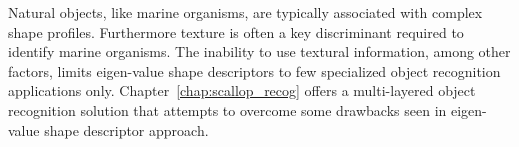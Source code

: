 \documentclass {udthesis}
\begin{document}
Natural objects, like marine organisms, are typically associated with complex shape profiles. Furthermore texture is often a key discriminant required to identify marine organisms. The inability to use textural information, among other factors, limits eigen-value shape descriptors to few specialized object recognition applications only. Chapter~\ref{chap:scallop_recog} offers a multi-layered object recognition solution that attempts to overcome some drawbacks seen in eigen-value shape descriptor approach.

\printglossary[type=\acronymtype]                  
\end{document}
